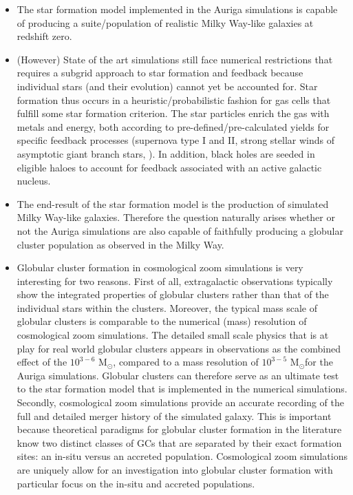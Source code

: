 \documentclass[a4paper,fleqn,usenatbib]{mnras}
\newcommand{\Sun}[0]{\ensuremath{_{\odot}}}
\begin{document}
\begin{itemize}
    \item The star formation model implemented in the Auriga simulations is capable of producing a suite/population of realistic Milky Way-like galaxies at redshift zero.
    \item (However) State of the art simulations still face numerical restrictions that requires a subgrid approach to star formation and feedback because individual stars (and their evolution) cannot yet be accounted for. Star formation thus occurs in a heuristic/probabilistic fashion for gas cells that fulfill some star formation criterion. The star particles enrich the gas with metals and energy, both according to pre-defined/pre-calculated yields for specific feedback processes (supernova type I and II, strong stellar winds of asymptotic giant branch stars, ). In addition, black holes are seeded in eligible haloes to account for feedback associated with an active galactic nucleus.
    \item The end-result of the star formation model is the production of simulated Milky Way-like galaxies. Therefore the question naturally arises whether or not the Auriga simulations are also capable of faithfully producing a globular cluster population as observed in the Milky Way.
    \item Globular cluster formation in cosmological zoom simulations is very interesting for two reasons. First of all, extragalactic observations typically show the integrated properties of globular clusters rather than that of the individual stars within the clusters. Moreover, the typical mass scale of globular clusters is comparable to the numerical (mass) resolution of cosmological zoom simulations. The detailed small scale physics that is at play for real world globular clusters appears in observations as the combined effect of the $10^{3-6}$ M\Sun, compared to a mass resolution of $10^{3-5}$ M\Sun for the Auriga simulations. Globular clusters can therefore serve as an ultimate test to the star formation model that is implemented in the numerical simulations. Secondly, cosmological zoom simulations provide an accurate recording of the full and detailed merger history of the simulated galaxy. This is important because theoretical paradigms for globular cluster formation in the literature know two distinct classes of GCs that are separated by their exact formation sites: an in-situ versus an accreted population. Cosmological zoom simulations are uniquely allow for an investigation into globular cluster formation with particular focus on the in-situ and accreted populations.
\end{itemize}
\end{document}
